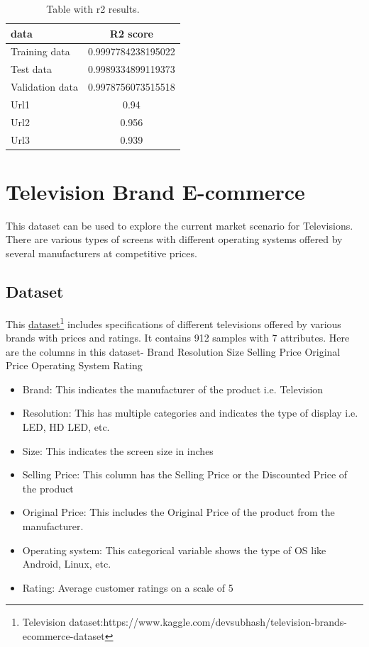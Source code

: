 \begin{table}[h!]
    \begin{center}
        \caption{Table with r2 results.}
        \label{tab:training results}
        \begin{tabular}{l|S} %
            \textbf{data} & \textbf{R2 score} \\
            \hline
            Training data & 0.9997784238195022\\
            Test data & 0.9989334899119373 \\
            Validation data & 0.9978756073515518\\
            Url1 & 0.94\\
            Url2 & 0.956\\
            Url3 & 0.939\\
        \end{tabular}
    \end{center}
\end{table}

\section{Television Brand E-commerce}
This dataset can be used to explore the current market scenario for Televisions. There are various types of screens with different operating systems offered by several manufacturers at competitive prices.

\subsection{Dataset}
\newcommand{\kagglelinktv}{https://www.kaggle.com/devsubhash/television-brands-ecommerce-dataset}

This \href{\kagglelinktv}{dataset\footnote{Television dataset:\href{\kagglelinktv}{\kagglelinktv}}} includes specifications of different televisions offered by various brands with prices and ratings.
It contains 912 samples with 7 attributes. Here are the columns in this dataset-
Brand Resolution Size Selling Price Original Price Operating System Rating

\begin{itemize}
    \item Brand: This indicates the manufacturer of the product i.e. Television
    \item Resolution: This has multiple categories and indicates the type of display i.e. LED, HD LED, etc.
    \item Size: This indicates the screen size in inches
    \item Selling Price: This column has the Selling Price or the Discounted Price of the product
    \item Original Price: This includes the Original Price of the product from the manufacturer.
    \item Operating system: This categorical variable shows the type of OS like Android, Linux, etc.
    \item Rating: Average customer ratings on a scale of 5
\end{itemize}

